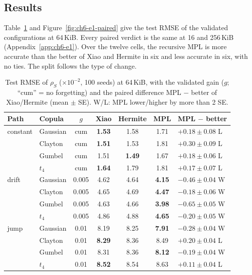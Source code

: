 \subsection{Results}

Table~\ref{tab:ch6-e1} and Figure~\ref{fig:ch6-e1-paired} give the test RMSE of the validated configurations at 64\,KiB.
Every paired verdict is the same at 16 and 256\,KiB (Appendix~\ref{app:ch6-e1}).
Over the twelve cells, the recursive MPL is more accurate than the better of Xiao and Hermite in six and less accurate in six, with no ties.
The split follows the type of change.

\begin{table}[ht]
\centering\small
\caption{Test RMSE of $\rho_S$ ($\times10^{-2}$, 100 seeds) at 64\,KiB, with the validated gain ($g$; ``cum'' = no forgetting) and the paired difference MPL $-$ better of Xiao/Hermite (mean $\pm$ SE). W/L: MPL lower/higher by more than 2 SE.}\label{tab:ch6-e1}
\begin{tabular}{@{}llccccl@{}}
\toprule
Path & Copula & $g$ & Xiao & Hermite & MPL & MPL $-$ better \\
\midrule
constant & Gaussian & cum & \textbf{1.53} & 1.58 & 1.71 & $+0.18 \pm 0.08$ L \\
         & Clayton  & cum & \textbf{1.51} & 1.53 & 1.81 & $+0.30 \pm 0.09$ L \\
         & Gumbel   & cum & 1.51 & \textbf{1.49} & 1.67 & $+0.18 \pm 0.06$ L \\
         & $t_4$    & cum & \textbf{1.64} & 1.79 & 1.81 & $+0.17 \pm 0.07$ L \\
\addlinespace
drift    & Gaussian & 0.005 & 4.62 & 4.64 & \textbf{4.15} & $-0.46 \pm 0.04$ W \\
         & Clayton  & 0.005 & 4.65 & 4.69 & \textbf{4.47} & $-0.18 \pm 0.06$ W \\
         & Gumbel   & 0.005 & 4.63 & 4.66 & \textbf{3.98} & $-0.65 \pm 0.05$ W \\
         & $t_4$    & 0.005 & 4.86 & 4.88 & \textbf{4.65} & $-0.20 \pm 0.05$ W \\
\addlinespace
jump     & Gaussian & 0.01 & 8.19 & 8.25 & \textbf{7.91} & $-0.28 \pm 0.04$ W \\
         & Clayton  & 0.01 & \textbf{8.29} & 8.36 & 8.49 & $+0.20 \pm 0.04$ L \\
         & Gumbel   & 0.01 & 8.31 & 8.36 & \textbf{8.12} & $-0.19 \pm 0.04$ W \\
         & $t_4$    & 0.01 & \textbf{8.52} & 8.54 & 8.63 & $+0.11 \pm 0.04$ L \\
\bottomrule
\end{tabular}
\end{table}

